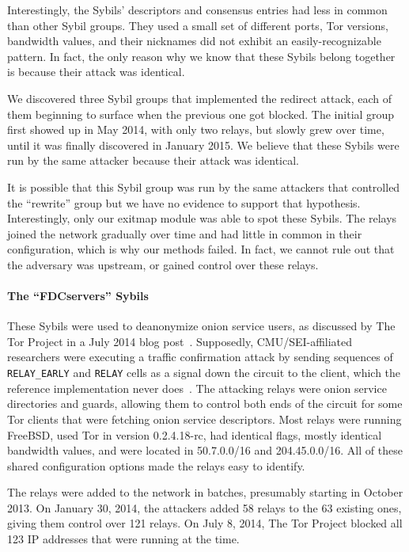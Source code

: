 Interestingly, the Sybils' descriptors and consensus entries had less in common
than other Sybil groups.  They used a small set of different ports, Tor
versions, bandwidth values, and their nicknames did not exhibit an
easily-recognizable pattern.  In fact, the only reason why we know that these
Sybils belong together is because their attack was identical.

We discovered three Sybil groups that implemented the redirect attack, each of
them beginning to surface when the previous one got blocked.  The initial group
first showed up in May 2014, with only two relays, but slowly grew over time,
until it was finally discovered in January 2015.  We believe that these Sybils
were run by the same attacker because their attack was identical.

It is possible that this Sybil group was run by the same attackers that
controlled the ``rewrite'' group but we have no evidence to support that
hypothesis.  Interestingly, only our exitmap module was able to spot these
Sybils.  The relays joined the network gradually over time and had little in
common in their configuration, which is why our \sys methods failed.  In fact,
we cannot rule out that the adversary was upstream, or gained control over these
relays.

\paragraph{The ``FDCservers'' Sybils}
These Sybils were used to deanonymize onion service users, as discussed by The
Tor Project in a July 2014 blog post~\cite{cmucert}.  Supposedly,
CMU/SEI-affiliated researchers were executing a traffic confirmation attack by
sending sequences of \texttt{RELAY\_EARLY} and \texttt{RELAY} cells as a signal
down the circuit to the client, which the reference implementation never
does~\cite{cmucert,cmucert2}.  The attacking relays were onion service
directories and guards, allowing them to control both ends of the circuit for
some Tor clients that were fetching onion service descriptors.  Most relays were
running FreeBSD, used Tor in version 0.2.4.18-rc, had identical flags, mostly
identical bandwidth values, and were located in 50.7.0.0/16 and 204.45.0.0/16.
All of these shared configuration options made the relays easy to identify.

The relays were added to the network in batches, presumably starting in October
2013.  On January 30, 2014, the attackers added 58 relays to the 63 existing
ones, giving them control over 121 relays.  On July 8, 2014, The Tor Project
blocked all 123 IP addresses that were running at the time.

